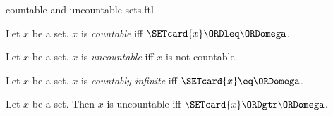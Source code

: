 \documentclass{stex}
\begin{document}
\begin{smodule}{countable-and-uncountable-sets.ftl}

\begin{definition}[forthel,id=SET_THEORY_07_8808604616359936]
  Let $x$ be a set.
  $x$ is \emph{countable} iff $\SETcard{x} \ORDleq \ORDomega$.
\end{definition}

\begin{definition}[forthel,id=SET_THEORY_07_2935263915409408]
  Let $x$ be a set.
  $x$ is \emph{uncountable} iff $x$ is not countable.
\end{definition}

\begin{definition}[forthel,id=SET_THEORY_07_5679866426949632]
  Let $x$ be a set.
  $x$ is \emph{countably infinite} iff $\SETcard{x} \eq \ORDomega$.
\end{definition}

\begin{proposition}[forthel,id=SET_THEORY_07_4281623468048384]
  Let $x$ be a set.
  Then $x$ is uncountable iff $\SETcard{x} \ORDgtr \ORDomega$.
\end{proposition}
\end{smodule}
\end{document}

